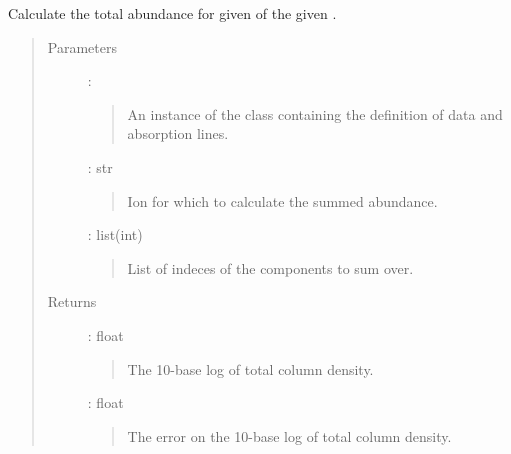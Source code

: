 \documentclass[letterpaper,10pt,english]{sphinxmanual}
\begin{document}

\begin{fulllineitems}
\label{\detokenize{api:output.sum_components}}
Calculate the total abundance for given  of the given .
\begin{quote}\begin{description}
\item[{Parameters}] \leavevmode
{} : {\hyperref[\detokenize{api:VoigtFit.DataSet}]{}}
\begin{quote}

An instance of the {\hyperref[\detokenize{api:VoigtFit.DataSet}]{}} class containing
the definition of data and absorption lines.
\end{quote}

 : str
\begin{quote}

Ion for which to calculate the summed abundance.
\end{quote}

 : list(int)
\begin{quote}

List of indeces of the components to sum over.
\end{quote}

\item[{Returns}] \leavevmode
{} : float
\begin{quote}

The 10-base log of total column density.
\end{quote}

 : float
\begin{quote}

The error on the 10-base log of total column density.
\end{quote}

\end{description}\end{quote}

\end{fulllineitems}
\end{document}
